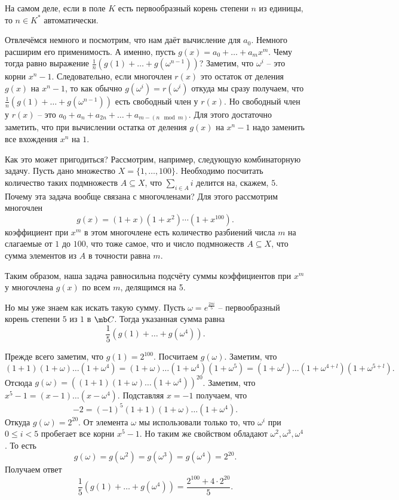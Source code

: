 \upr На самом деле, если в поле $K$ есть первообразный корень степени $n$ из единицы, то $n \in K^*$ автоматически.
\eupr

Отвлечёмся немного и посмотрим, что нам даёт вычисление для $a_0$. Немного расширим его применимость. А именно, пусть $g(x)=a_0+\dots+ a_m x^m$. Чему тогда равно выражение $\frac{1}{n}\left(g(1)+\dots+g(\omega^{n-1})\right)$? Заметим, что $\omega^i$ -- это корни $x^n-1$. Следовательно, если многочлен $r(x)$ это остаток от деления $g(x)$ на $x^n-1$, то как обычно $g(\omega^i)=r(\omega^i)$ откуда мы сразу  получаем, что $\frac{1}{n}\left(g(1)+\dots+g(\omega^{n-1})\right)$ есть свободный член у $r(x)$. Но свободный член у $r(x)$ -- это $a_0+a_n+a_{2n}+\dots + a_{m-(n\mod m)}$. Для этого достаточно заметить, что при вычислении остатка от деления $g(x)$ на $x^n-1$ надо заменить все вхождения $x^n$ на $1$.

Как это может пригодиться? Рассмотрим, например, следующую комбинаторную задачу. Пусть дано множество $X=\{1,\dots,100\}$. Необходимо посчитать количество таких подмножеств $A\subseteq X$, что $\sum_{i\in A} i$ делится на, скажем, $5$. Почему эта задача вообще связана с многочленами? Для этого рассмотрим многочлен $$g(x)=(1+x)(1+x^2)\cdots(1+x^{100}).$$
коэффициент при $x^m$ в этом многочлене есть количество разбиений числа $m$ на слагаемые от $1$ до $100$, что тоже самое, что и число подмножеств $A \subseteq X$, что сумма элементов из $A$ в точности равна $m$. 

Таким образом, наша задача равносильна подсчёту суммы коэффициентов при $x^m$ у многочлена $g(x)$ по всем $m$, делящимся на 5.

Но мы уже знаем как искать такую сумму. Пусть $\omega=e^{\frac{2\pi i}{5}}$ -- первообразный корень степени $5$ из $1$ в $\mb C$. Тогда указанная сумма равна 
$$\frac{1}{5}\left(g(1)+\dots+g(\omega^4)\right).$$

Прежде всего заметим, что $g(1)=2^{100}$. Посчитаем $g(\omega)$. Заметим, что $$(1+1)(1+\omega)\dots(1+\omega^4)=(1+\omega)\dots(1+\omega^4)(1+\omega^5)=(1+\omega^l)\dots(1+\omega^{4+l})(1+\omega^{5+l}).$$
Отсюда $g(\omega)= ((1+1)(1+\omega)\dots(1+\omega^4))^{20}$. Заметим, что $x^5-1=(x-1)\dots(x-\omega^4)$. Подставляя $x=-1$ получаем, что 
$$-2=(-1)^5(1+1)(1+\omega)\dots(1+\omega^4).$$
Откуда $g(\omega)=2^{20}$. От элемента $\omega$ мы использовали только то, что $\omega^i$ при $0\leq i <5$ пробегает все корни $x^5-1$. Но таким же свойством обладают $\omega^2, \omega^3,\omega^4$. То есть $$g(\omega)=g(\omega^2)=g(\omega^3)=g(\omega^4)=2^{20}.$$
Получаем ответ 
$$\frac{1}{5}\left(g(1)+\dots+g(\omega^4)\right)=\frac{2^{100}+4\cdot 2^{20}}{5}.$$

